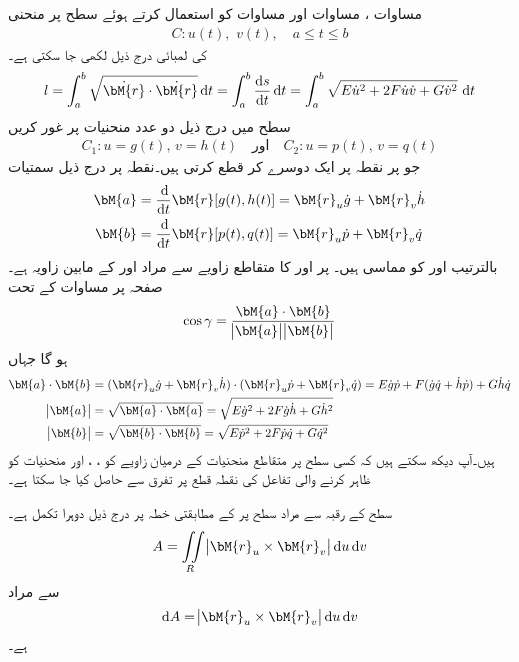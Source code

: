 مساوات ، مساوات  اور مساوات  کو استعمال کرتے ہوئے سطح  پر منحنی
\begin{align*}
C:u(t),\,\, v(t),\quad a\le t\le b
\end{align*}
کی لمبائی درج ذیل لکھی جا سکتی ہے۔
\begin{align}
l=\int_a^b \sqrt{\dot{\bM{r}}\cdot \dot{\bM{r}}}\dif t=\int_a^b \frac{\dif s}{\dif t}\dif t=\int_a^b \sqrt{E\dot{u}^2+2F\dot{u}\dot{v}+G\dot{v}^2}\,\dif t
\end{align}
سطح  میں درج ذیل دو عدد منحنیات پر غور کریں
\begin{align*}
C_1:u=g(t),\, v=h(t) \quad \text{اور} \quad C_2:u=p(t),\, v=q(t)
\end{align*}
جو  پر نقطہ  پر ایک دوسرے کر قطع کرتی ہیں۔نقطہ  پر درج ذیل سمتیات
\begin{align*}
\bM{a}&=\frac{\dif}{\dif t}\bM{r}[g(t),h(t)]=\bM{r}_u\dot{g}+\bM{r}_v\dot{h}\\
\bM{b}&=\frac{\dif}{\dif t}\bM{r}[p(t),q(t)]=\bM{r}_u\dot{p}+\bM{r}_v\dot{q}
\end{align*}
بالترتیب  اور  کو مماسی ہیں۔ پر  اور  کا متقاطع زاویے سے مراد  اور  کے مابین زاویہ  ہے۔صفحہ  پر مساوات  کے تحت
\begin{align}
\cos \gamma=\frac{\bM{a}\cdot \bM{b}}{\abs{\bM{a}}\abs{\bM{b}}}
\end{align}
ہو گا جہاں
\begin{align*}
\bM{a}\cdot\bM{b}&=(\bM{r}_u\dot{g}+\bM{r}_v\dot{h})\cdot (\bM{r}_u\dot{p}+\bM{r}_v\dot{q})=E\dot{g}\dot{p}+F(\dot{g}\dot{q}+\dot{h}\dot{p})+G\dot{h}\dot{q}\\
\abs{\bM{a}}&=\sqrt{\bM{a}\cdot\bM{a}}=\sqrt{E\dot{g}^2+2F\dot{g}\dot{h}+G\dot{h}^2}\\
\abs{\bM{b}}&=\sqrt{\bM{b}\cdot\bM{b}}=\sqrt{E\dot{p}^2+2F\dot{p}\dot{q}+G\dot{q}^2}
\end{align*}
ہیں۔آپ دیکھ سکتے ہیں کہ کسی سطح پر متقاطع منحنیات کے درمیان زاویے کو ، ،  اور  منحنیات کو ظاہر کرنے والی تفاعل کی نقطہ قطع پر تفرق سے حاصل کیا جا سکتا ہے۔

سطح  کے رقبہ  سے مراد  سطح پر  کے مطابقتی خطہ  پر درج ذیل دوہرا تکمل ہے۔
\begin{align}
A=\iint\limits_R \abs{\bM{r}_u\times \bM{r}_v}\dif u\dif v
\end{align}  
 سے مراد
\begin{align}
\dif A=\abs{\bM{r}_u\times \bM{r}_v}\dif u\dif v
\end{align}
ہے۔
